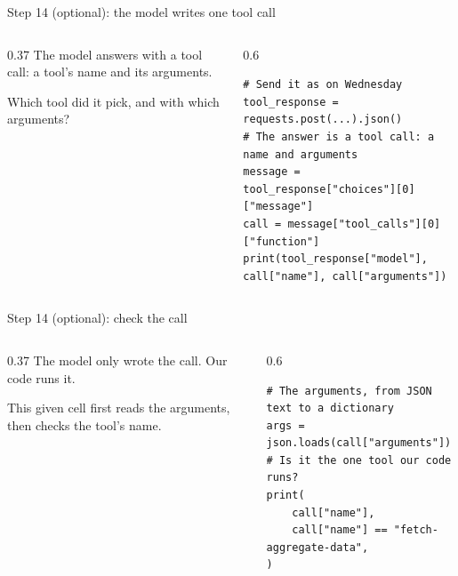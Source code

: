 \documentclass[9pt,aspectratio=169]{beamer}
\begin{document}
\begin{frame}[fragile]{Step 14 (optional): the model writes one tool call}
    \begin{columns}[T]
        \begin{column}{0.37\textwidth}
            The model answers with a tool call: a tool's name and its arguments.

            \medskip
            Which tool did it pick, and with which arguments?
        \end{column}
        \begin{column}{0.6\textwidth}
\begin{lstlisting}
# Send it as on Wednesday
tool_response = requests.post(...).json()
# The answer is a tool call: a name and arguments
message = tool_response["choices"][0]["message"]
call = message["tool_calls"][0]["function"]
print(tool_response["model"], call["name"], call["arguments"])
\end{lstlisting}
        \end{column}
    \end{columns}
\end{frame}

\begin{frame}[fragile]{Step 14 (optional): check the call}
    \begin{columns}[T]
        \begin{column}{0.37\textwidth}
            The model only wrote the call. Our code runs it.

            \medskip
            This given cell first reads the arguments, then checks the tool's name.
        \end{column}
        \begin{column}{0.6\textwidth}
\begin{lstlisting}
# The arguments, from JSON text to a dictionary
args = json.loads(call["arguments"])
# Is it the one tool our code runs?
print(
    call["name"],
    call["name"] == "fetch-aggregate-data",
)
\end{lstlisting}
        \end{column}
    \end{columns}
\end{frame}
\end{document}
